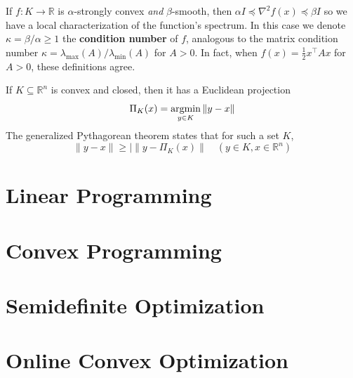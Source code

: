 \documentclass[11pt, letterpaper]{article}
\begin{document}
\begin{remark}
    If \(f : K \to \mathbb{R}\) is \(\alpha\)-strongly convex \textit{and} \(\beta\)-smooth, then \(\alpha I \preceq \nabla^2 f(x) \preceq \beta I\) so we have a local characterization of the function's spectrum. In this case we denote \(\kappa = \beta / \alpha \geq 1\) the \textbf{condition number} of \(f\), analogous to the matrix condition number \(\kappa = \lambda_{\max}(A) / \lambda_{\min}(A)\) for \(A > 0\). In fact, when \(f(x) = \frac{1}{2} x^\top Ax\) for \(A > 0\), these definitions agree. 
\end{remark}

\begin{concept}
    If \(K \subseteq \mathbb{R}^n\) is convex and closed, then it has a Euclidean projection 
    \[
        \Pi_K(x) = \operatorname*{argmin}_{y \in K} \|y - x\|
    \]
    The generalized Pythagorean theorem states that for such a set \(K\), 
    \[
        \|y - x\| \geq \left|\|y - \Pi_K(x)\right\| 
        \quad (y \in K, x \in \mathbb{R}^n)
    \]
\end{concept}

\newpage
\section{Linear Programming}

\newpage
\section{Convex Programming}

\newpage
\section{Semidefinite Optimization}

\newpage
\section{Online Convex Optimization}
\end{document}
